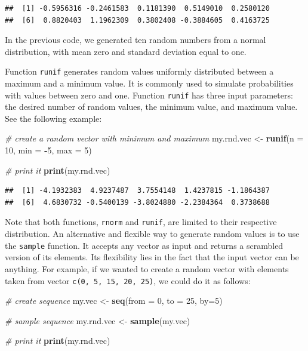 \documentclass[11pt,]{book}
\newenvironment{Shaded}{\begin{snugshade}}{\end{snugshade}}
\newcommand{\KeywordTok}[1]{\textcolor[rgb]{0.27,0.27,0.27}{\textbf{#1}}}
\newcommand{\DataTypeTok}[1]{\textcolor[rgb]{0.27,0.27,0.27}{#1}}
\newcommand{\DecValTok}[1]{\textcolor[rgb]{0.06,0.06,0.06}{#1}}
\newcommand{\StringTok}[1]{\textcolor[rgb]{0.5,0.5,0.5}{#1}}
\newcommand{\CommentTok}[1]{\textcolor[rgb]{0.56,0.35,0.01}{\textit{#1}}}
\newcommand{\OperatorTok}[1]{\textcolor[rgb]{0.81,0.36,0.00}{\textbf{#1}}}
\newcommand{\NormalTok}[1]{#1}
\begin{document}
\begin{verbatim}
##  [1] -0.5956316 -0.2461583  0.1181390  0.5149010  0.2580120
##  [6]  0.8820403  1.1962309  0.3802408 -0.3884605  0.4163725
\end{verbatim}

In the previous code, we generated ten random numbers from a normal
distribution, with mean zero and standard deviation equal to one.

Function \texttt{runif} generates random values uniformly distributed
between a maximum and a minimum value. It is commonly used to simulate
probabilities with values between zero and one. Function \texttt{runif}
has three input parameters: the desired number of random values, the
minimum value, and maximum value. See the following example:

\begin{Shaded}
\begin{Highlighting}[]
\CommentTok{# create a random vector with minimum and maximum}
\NormalTok{my.rnd.vec <-}\StringTok{ }\KeywordTok{runif}\NormalTok{(}\DataTypeTok{n =} \DecValTok{10}\NormalTok{, }\DataTypeTok{min =} \OperatorTok{-}\DecValTok{5}\NormalTok{, }\DataTypeTok{max =} \DecValTok{5}\NormalTok{)}

\CommentTok{# print it}
\KeywordTok{print}\NormalTok{(my.rnd.vec)}
\end{Highlighting}
\end{Shaded}

\begin{verbatim}
##  [1] -4.1932383  4.9237487  3.7554148  1.4237815 -1.1864387
##  [6]  4.6830732 -0.5400139 -3.8024880 -2.2384364  0.3738688
\end{verbatim}

Note that both functions, \texttt{rnorm} and \texttt{runif}, are limited
to their respective distribution. An alternative and flexible way to
generate random values is to use the \texttt{sample} function. It
accepts any vector as input and returns a scrambled version of its
elements. Its flexibility lies in the fact that the input vector can be
anything. For example, if we wanted to create a random vector with
elements taken from vector \texttt{c(0,\ 5,\ 15,\ 20,\ 25)}, we could do
it as follows: 

\begin{Shaded}
\begin{Highlighting}[]
\CommentTok{# create sequence}
\NormalTok{my.vec <-}\StringTok{ }\KeywordTok{seq}\NormalTok{(}\DataTypeTok{from =} \DecValTok{0}\NormalTok{, }\DataTypeTok{to =} \DecValTok{25}\NormalTok{, }\DataTypeTok{by=}\DecValTok{5}\NormalTok{)}

\CommentTok{# sample sequence}
\NormalTok{my.rnd.vec <-}\StringTok{ }\KeywordTok{sample}\NormalTok{(my.vec)}

\CommentTok{# print it}
\KeywordTok{print}\NormalTok{(my.rnd.vec)}
\end{Highlighting}
\end{Shaded}
\end{document}

